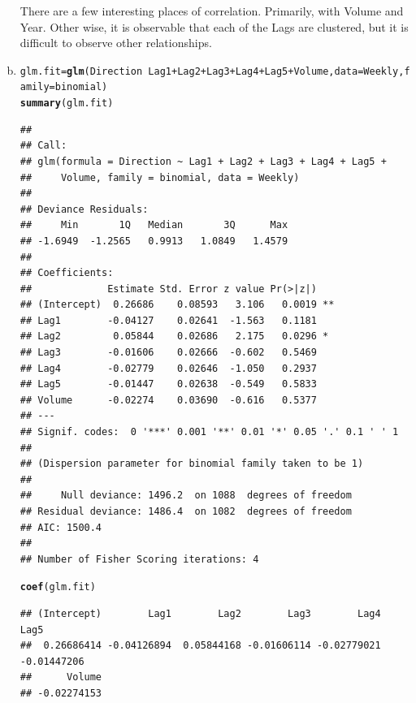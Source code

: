 \documentclass{article}\usepackage[]{graphicx}\usepackage[]{color}
\makeatletter
\newcommand{\hlopt}[1]{\textcolor[rgb]{0,0,0}{#1}}%
\newcommand{\hlstd}[1]{\textcolor[rgb]{0.345,0.345,0.345}{#1}}%
\newcommand{\hlkwb}[1]{\textcolor[rgb]{0.69,0.353,0.396}{#1}}%
\newcommand{\hlkwc}[1]{\textcolor[rgb]{0.333,0.667,0.333}{#1}}%
\newcommand{\hlkwd}[1]{\textcolor[rgb]{0.737,0.353,0.396}{\textbf{#1}}}%
\newenvironment{kframe}{%
 \def\at@end@of@kframe{}%
 \ifinner\ifhmode%
  \def\at@end@of@kframe{\end{minipage}}%
  \begin{minipage}{\columnwidth}%
 \fi\fi%
 \def\FrameCommand##1{\hskip\@totalleftmargin \hskip-\fboxsep
 \colorbox{shadecolor}{##1}\hskip-\fboxsep
     \hskip-\linewidth \hskip-\@totalleftmargin \hskip\columnwidth}%
 \MakeFramed {\advance\hsize-\width
   \@totalleftmargin\z@ \linewidth\hsize
   \@setminipage}}%
 {\par\unskip\endMakeFramed%
 \at@end@of@kframe}
\newenvironment{knitrout}{}{} %
\makeatother
\begin{document}
\begin{enumerate}[(a)]
\begin{knitrout}
\end{knitrout}
There are a few interesting places of correlation. Primarily, with Volume and Year. Other wise, it is observable that each of the Lags are clustered, but it is difficult to observe other relationships.

\item
\begin{knitrout}
\color{fgcolor}\begin{kframe}
\begin{alltt}
\hlstd{glm.fit}\hlkwb{=}\hlkwd{glm}\hlstd{(Direction}\hlopt{~}\hlstd{Lag1}\hlopt{+}\hlstd{Lag2}\hlopt{+}\hlstd{Lag3}\hlopt{+}\hlstd{Lag4}\hlopt{+}\hlstd{Lag5}\hlopt{+}\hlstd{Volume,}\hlkwc{data}\hlstd{=Weekly,} \hlkwc{family} \hlstd{= binomial)}
\hlkwd{summary}\hlstd{(glm.fit)}
\end{alltt}
\begin{verbatim}
## 
## Call:
## glm(formula = Direction ~ Lag1 + Lag2 + Lag3 + Lag4 + Lag5 + 
##     Volume, family = binomial, data = Weekly)
## 
## Deviance Residuals: 
##     Min       1Q   Median       3Q      Max  
## -1.6949  -1.2565   0.9913   1.0849   1.4579  
## 
## Coefficients:
##             Estimate Std. Error z value Pr(>|z|)   
## (Intercept)  0.26686    0.08593   3.106   0.0019 **
## Lag1        -0.04127    0.02641  -1.563   0.1181   
## Lag2         0.05844    0.02686   2.175   0.0296 * 
## Lag3        -0.01606    0.02666  -0.602   0.5469   
## Lag4        -0.02779    0.02646  -1.050   0.2937   
## Lag5        -0.01447    0.02638  -0.549   0.5833   
## Volume      -0.02274    0.03690  -0.616   0.5377   
## ---
## Signif. codes:  0 '***' 0.001 '**' 0.01 '*' 0.05 '.' 0.1 ' ' 1
## 
## (Dispersion parameter for binomial family taken to be 1)
## 
##     Null deviance: 1496.2  on 1088  degrees of freedom
## Residual deviance: 1486.4  on 1082  degrees of freedom
## AIC: 1500.4
## 
## Number of Fisher Scoring iterations: 4
\end{verbatim}
\begin{alltt}
\hlkwd{coef}\hlstd{(glm.fit)}
\end{alltt}
\begin{verbatim}
## (Intercept)        Lag1        Lag2        Lag3        Lag4        Lag5 
##  0.26686414 -0.04126894  0.05844168 -0.01606114 -0.02779021 -0.01447206 
##      Volume 
## -0.02274153
\end{verbatim}
\end{kframe}
\end{knitrout}


\end{enumerate}
\end{document}
